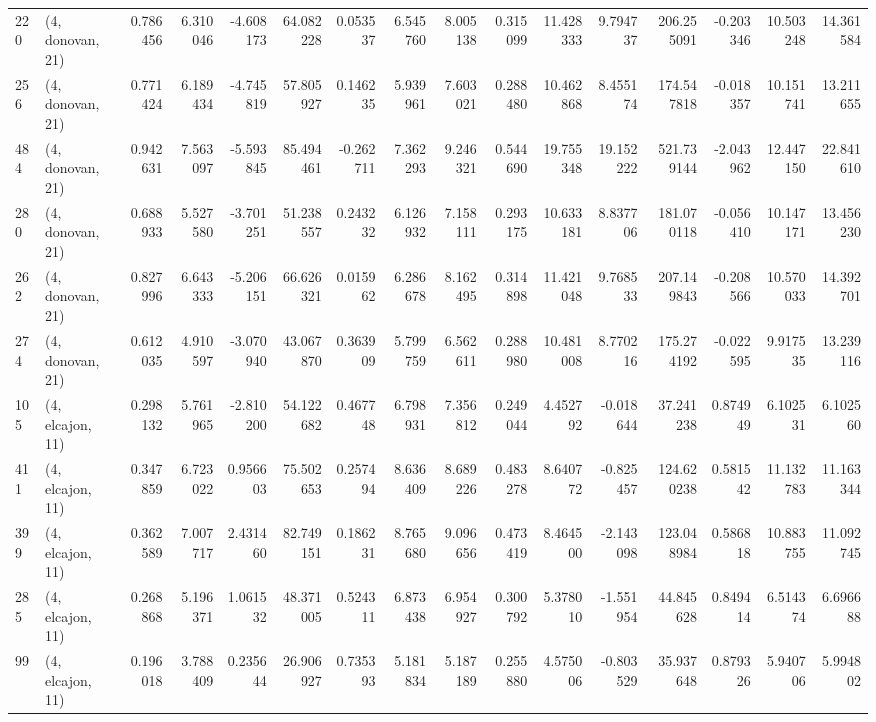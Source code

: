 \begin{tabular}{llrrrrrrrrrrrrrr}
220 &  (4, donovan, 21) &   0.786456 &   6.310046 &  -4.608173 &    64.082228 &   0.053537 &   6.545760 &   8.005138 &  0.315099 &  11.428333 &   9.794737 &   206.255091 & -0.203346 &  10.503248 &  14.361584 \\
256 &  (4, donovan, 21) &   0.771424 &   6.189434 &  -4.745819 &    57.805927 &   0.146235 &   5.939961 &   7.603021 &  0.288480 &  10.462868 &   8.455174 &   174.547818 & -0.018357 &  10.151741 &  13.211655 \\
484 &  (4, donovan, 21) &   0.942631 &   7.563097 &  -5.593845 &    85.494461 &  -0.262711 &   7.362293 &   9.246321 &  0.544690 &  19.755348 &  19.152222 &   521.739144 & -2.043962 &  12.447150 &  22.841610 \\
280 &  (4, donovan, 21) &   0.688933 &   5.527580 &  -3.701251 &    51.238557 &   0.243232 &   6.126932 &   7.158111 &  0.293175 &  10.633181 &   8.837706 &   181.070118 & -0.056410 &  10.147171 &  13.456230 \\
262 &  (4, donovan, 21) &   0.827996 &   6.643333 &  -5.206151 &    66.626321 &   0.015962 &   6.286678 &   8.162495 &  0.314898 &  11.421048 &   9.768533 &   207.149843 & -0.208566 &  10.570033 &  14.392701 \\
274 &  (4, donovan, 21) &   0.612035 &   4.910597 &  -3.070940 &    43.067870 &   0.363909 &   5.799759 &   6.562611 &  0.288980 &  10.481008 &   8.770216 &   175.274192 & -0.022595 &   9.917535 &  13.239116 \\
105 &  (4, elcajon, 11) &   0.298132 &   5.761965 &  -2.810200 &    54.122682 &   0.467748 &   6.798931 &   7.356812 &  0.249044 &   4.452792 &  -0.018644 &    37.241238 &  0.874949 &   6.102531 &   6.102560 \\
411 &  (4, elcajon, 11) &   0.347859 &   6.723022 &   0.956603 &    75.502653 &   0.257494 &   8.636409 &   8.689226 &  0.483278 &   8.640772 &  -0.825457 &   124.620238 &  0.581542 &  11.132783 &  11.163344 \\
399 &  (4, elcajon, 11) &   0.362589 &   7.007717 &   2.431460 &    82.749151 &   0.186231 &   8.765680 &   9.096656 &  0.473419 &   8.464500 &  -2.143098 &   123.048984 &  0.586818 &  10.883755 &  11.092745 \\
285 &  (4, elcajon, 11) &   0.268868 &   5.196371 &   1.061532 &    48.371005 &   0.524311 &   6.873438 &   6.954927 &  0.300792 &   5.378010 &  -1.551954 &    44.845628 &  0.849414 &   6.514374 &   6.696688 \\
99  &  (4, elcajon, 11) &   0.196018 &   3.788409 &   0.235644 &    26.906927 &   0.735393 &   5.181834 &   5.187189 &  0.255880 &   4.575006 &  -0.803529 &    35.937648 &  0.879326 &   5.940706 &   5.994802 \\

\end{tabular}
